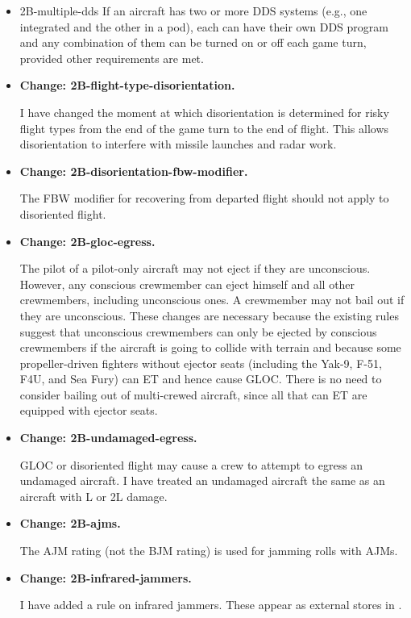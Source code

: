 \documentclass[10pt]{report}
\newcommand{\itemtag}[1]{\item \textbf{Change: #1.}\par}
\begin{document}
\begin{itemize}
    
    \item{2B-multiple-dds} If an aircraft has two or more DDS systems (e.g., one integrated and the other in a pod), each can have their own DDS program and any combination of them can be turned on or off each game turn, provided other requirements are met.

    \itemtag{2B-flight-type-disorientation} I have changed the moment at which disorientation is determined for risky flight types from the end of the game turn to the end of flight. This allows disorientation to interfere with missile launches and radar work.
    
    \itemtag{2B-disorientation-fbw-modifier} The FBW modifier for recovering from departed flight should not apply to disoriented flight.

    \itemtag{2B-gloc-egress} The pilot of a pilot-only aircraft may not eject if they are unconscious. However, any conscious crewmember can eject himself and all other crewmembers, including unconscious ones. A crewmember may not bail out if they are unconscious. These changes are necessary because the existing rules suggest that unconscious crewmembers can only be ejected by conscious crewmembers if the aircraft is going to collide with terrain and because some propeller-driven fighters without ejector seats (including the Yak-9, F-51, F4U, and Sea Fury) can ET and hence cause GLOC. There is no need to consider bailing out of multi-crewed aircraft, since all that can ET are equipped with ejector seats.

    \itemtag{2B-undamaged-egress} GLOC or disoriented flight may cause a crew to attempt to egress an undamaged aircraft. I have treated an undamaged aircraft the same as an aircraft with L or 2L damage.
    
    \itemtag{2B-ajms} The AJM rating (not the BJM rating) is used for jamming rolls with AJMs.
    
    \itemtag{2B-infrared-jammers} I have added a rule on infrared jammers. These appear as external stores in {\TSOH}.
    
    

\end{itemize}
\end{document}
